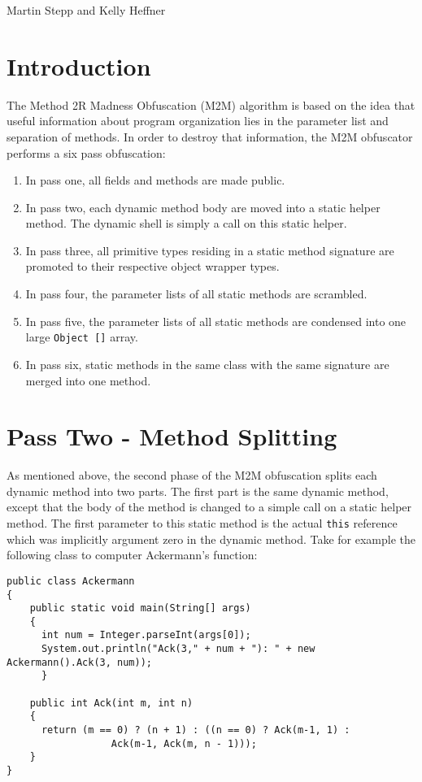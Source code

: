 %
          {Martin Stepp and Kelly Heffner}
          

\section{Introduction}
The Method 2R Madness Obfuscation (M2M) algorithm is based on the idea that
useful information about program organization lies in the parameter list
and separation of methods.  In order to destroy that information, the M2M 
obfuscator performs a six pass obfuscation:
\begin{enumerate}
\item In pass one, all fields and methods are made public.
\item In pass two, each dynamic method body are moved into a static helper
method.  The dynamic shell is simply a call on this static helper.
\item In pass three, all primitive types residing in a static method signature
are promoted to their respective object wrapper types.
\item In pass four, the parameter lists of all static methods are scrambled.
\item In pass five, the parameter lists of all static methods are condensed into
one large \verb/Object []/ array.
\item In pass six, static methods in the same class with the same signature are
merged into one method.
\end{enumerate}

\section{Pass Two - Method Splitting}
As mentioned above, the second phase of the M2M obfuscation splits each dynamic method
into two parts.  The first part is the same dynamic method, except that the body
of the method is changed to a simple call on a static helper method.  The first parameter
to this static method is the actual \verb/this/ reference which was implicitly argument
zero in the dynamic method.  Take for example the following class to computer Ackermann's 
function:
\begin{verbatim}
public class Ackermann 
{
    public static void main(String[] args) 
    {
      int num = Integer.parseInt(args[0]);
      System.out.println("Ack(3," + num + "): " + new Ackermann().Ack(3, num));
      }
    
    public int Ack(int m, int n) 
    {
      return (m == 0) ? (n + 1) : ((n == 0) ? Ack(m-1, 1) :
                  Ack(m-1, Ack(m, n - 1)));
    }
}
\end{verbatim}

